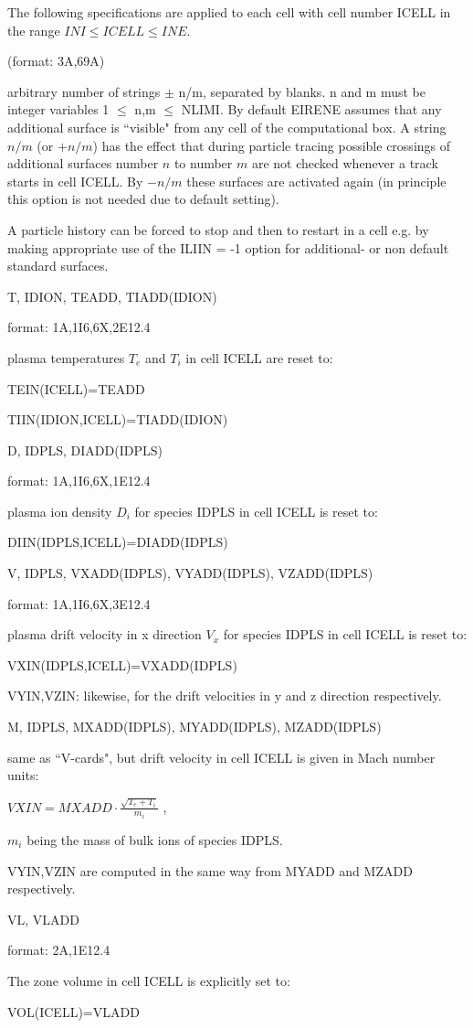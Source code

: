 The following specifications are applied to each cell with
cell number ICELL in the range  $INI \leq ICELL \leq INE$.
\begin{list}{ }{}
\item[{\bf ``CH3-cards" }] (format: 3A,69A)

arbitrary number of strings $\pm$ n/m, separated by blanks. n and
m must be integer variables 1 $\le$ n,m $\le$ NLIMI. By default
EIRENE assumes that any additional surface is ``visible" from any
cell of the computational box. A string $n/m$ (or $+n/m$) has the
effect that during particle tracing possible crossings of
additional surfaces number $n$ to number $m$ are not checked whenever
a track starts in cell ICELL. By $-n/m$ these surfaces are activated
again (in principle this option is not needed due to default
setting). 

A particle history can be forced to stop and then to
restart in a cell e.g. by making appropriate use of the ILIIN = -1
option for additional- or non default standard surfaces.
\item[{\bf ``T-cards" }] T, IDION, TEADD, TIADD(IDION)

format: 1A,1I6,6X,2E12.4

plasma temperatures $T_e $ and $T_i $ in cell
ICELL are reset to:

TEIN(ICELL)=TEADD

TIIN(IDION,ICELL)=TIADD(IDION)
\item[{\bf ``D-cards" }] D, IDPLS,
DIADD(IDPLS)

format: 1A,1I6,6X,1E12.4

plasma ion density $D_i $ for species IDPLS in cell
ICELL is reset to:

DIIN(IDPLS,ICELL)=DIADD(IDPLS) \item[{\bf ``V-cards" }] V, IDPLS,
VXADD(IDPLS), VYADD(IDPLS), VZADD(IDPLS)

format: 1A,1I6,6X,3E12.4

plasma drift velocity in x direction
$V_x $ for species IDPLS in cell
ICELL is reset to:

VXIN(IDPLS,ICELL)=VXADD(IDPLS)

VYIN,VZIN: likewise, for the drift velocities in y and z direction
respectively.
\item[{\bf ``M-cards" }] M, IDPLS, MXADD(IDPLS),
MYADD(IDPLS), MZADD(IDPLS)

same as ``V-cards", but drift velocity in cell ICELL is given in
Mach number units:

$VXIN = MXADD  \cdot
\frac{\sqrt{ T_e + T_i }}   {m_i} $ ,

$m_i $ being the mass of bulk ions of species IDPLS.

VYIN,VZIN are computed in the same way from MYADD and MZADD
respectively.
\item[{\bf ``VL-cards" }] VL, VLADD

format: 2A,1E12.4

The zone volume in cell ICELL is explicitly set to:

VOL(ICELL)=VLADD
\end{list}
